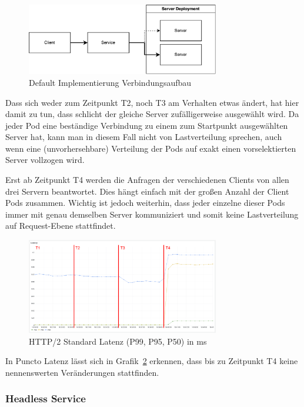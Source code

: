 \begin{figure}[H]
    \centering
    \includegraphics[width=0.75\textwidth]{img/default_loadbalancing}
    \caption{Default Implementierung Verbindungsaufbau}
    \label{fig:default_loadbalancing}
\end{figure}


Dass sich weder zum Zeitpunkt T2, noch T3 am Verhalten etwas ändert, hat hier damit zu tun, dass schlicht der gleiche Server zufälligerweise ausgewählt wird.
Da jeder Pod eine beständige Verbindung zu einem zum Startpunkt ausgewählten Server hat, kann man in diesem Fall nicht von Lastverteilung sprechen, auch wenn eine (unvorhersehbare) Verteilung der Pods auf exakt einen vorselektierten Server vollzogen wird.

Erst ab Zeitpunkt T4 werden die Anfragen der verschiedenen Clients von allen drei Servern beantwortet.
Dies hängt einfach mit der großen Anzahl der Client Pods zusammen.
Wichtig ist jedoch weiterhin, dass jeder einzelne dieser Pods immer mit genau demselben Server kommuniziert und somit keine Lastverteilung auf Request-Ebene stattfindet.


\begin{figure}[H]
    \centering
    \includegraphics[width=0.75\textwidth]{img/default_latenz}
    \caption{HTTP/2 Standard Latenz (P99, P95, P50) in ms}
    \label{fig:default_latenz}
\end{figure}

In Puncto Latenz lässt sich in Grafik~\ref{fig:default_latenz} erkennen, dass bis zu Zeitpunkt T4 keine nennenswerten Veränderungen stattfinden.

\subsubsection{Headless Service}\label{subsubsec:headless}

